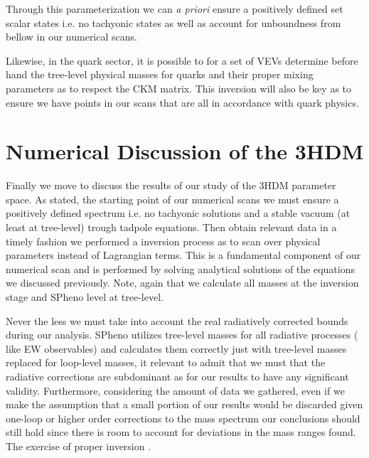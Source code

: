 Through this parameterization we can \textit{a priori} ensure a positively defined set scalar states i.e. no tachyonic states as well as account for unboundness from bellow in our numerical scans. 

Likewise, in the quark sector, it is possible to for a set of VEVs determine before hand the tree-level physical masses for quarks and their proper mixing parameters as to respect the CKM matrix. 
%
This inversion will also be key as to ensure we have points in our scans that are all in accordance with quark physics. 

\section{Numerical Discussion of the 3HDM} 

Finally we move to discuss the results of our study of the 3HDM parameter space.
%
%
As stated,  the starting point of our numerical scans we must ensure a positively defined spectrum i.e. no tachyonic solutions and a stable vacuum (at least at tree-level) trough tadpole equations. %
% 
% 
Then  obtain relevant data in a timely fashion we performed a inversion process as to scan over physical parameters instead of Lagrangian terms.  
% 
This is a fundamental component of our numerical scan and is performed by solving analytical solutions of the equations we discussed previously. 
%
%
Note, again that we calculate all masses at the inversion stage and SPheno level at tree-level.  

Never the less we must take into account the real radiatively corrected bounds during our analysis. 
%
 SPheno utilizes  tree-level masses for all radiative processes ( like EW observables) and calculates them correctly just with tree-level masses replaced for loop-level masses,  it  relevant to admit that we must  that the radiative corrections are subdominant as for our results to have any significant validity.
%
Furthermore, considering the amount of data we gathered, even if we make the assumption that a small portion of our results would be discarded given one-loop or higher order corrections to the mass spectrum our conclusions should still hold since there is room to account for deviations in the mass ranges found.
% 
The exercise of proper inversion .


